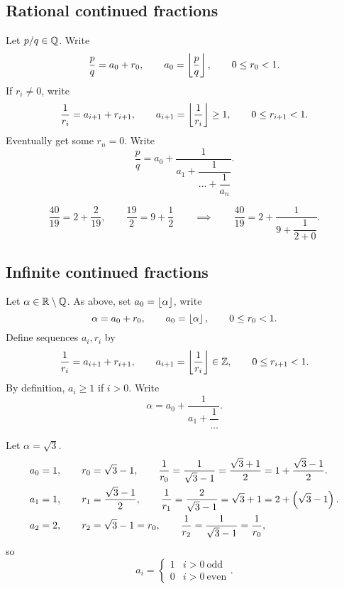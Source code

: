 \subsection{Rational continued fractions}

Let $ p / q \in \mathbb{Q} $. Write
$$ \dfrac{p}{q} = a_0 + r_0, \qquad a_0 = \left\lfloor \dfrac{p}{q} \right\rfloor, \qquad 0 \le r_0 < 1. $$
If $ r_i \ne 0 $, write
$$ \dfrac{1}{r_i} = a_{i + 1} + r_{i + 1}, \qquad a_{i + 1} = \left\lfloor \dfrac{1}{r_i} \right\rfloor \ge 1, \qquad 0 \le r_{i + 1} < 1. $$
Eventually get some $ r_n = 0 $. Write
$$ \dfrac{p}{q} = a_0 + \dfrac{1}{a_1 + \dfrac{1}{\dots + \dfrac{1}{a_n}}}. $$

\begin{example*}
$$ \dfrac{40}{19} = 2 + \dfrac{2}{19}, \qquad \dfrac{19}{2} = 9 + \dfrac{1}{2} \qquad \implies \qquad \dfrac{40}{19} = 2 + \dfrac{1}{9 + \dfrac{1}{2 + 0}}. $$
\end{example*}

\subsection{Infinite continued fractions}

Let $ \alpha \in \mathbb{R} \setminus \mathbb{Q} $. As above, set $ a_0 = \left\lfloor \alpha \right\rfloor $, write
$$ \alpha = a_0 + r_0, \qquad a_0 = \left\lfloor \alpha \right\rfloor, \qquad 0 \le r_0 < 1. $$
Define sequences $ a_i, r_i $ by
$$ \dfrac{1}{r_i} = a_{i + 1} + r_{i + 1}, \qquad a_{i + 1} = \left\lfloor \dfrac{1}{r_i} \right\rfloor \in \mathbb{Z}, \qquad 0 \le r_{i + 1} < 1. $$
By definition, $ a_i \ge 1 $ if $ i > 0 $. Write
$$ \alpha = a_0 + \dfrac{1}{a_1 + \dfrac{1}{\dots}}. $$

\begin{example*}
Let $ \alpha = \sqrt{3} $.
\begin{align*}
& a_0 = 1, \qquad r_0 = \sqrt{3} - 1, \qquad \dfrac{1}{r_0} = \dfrac{1}{\sqrt{3} - 1} = \dfrac{\sqrt{3} + 1}{2} = 1 + \dfrac{\sqrt{3} - 1}{2}. \\
& a_1 = 1, \qquad r_1 = \dfrac{\sqrt{3} - 1}{2}, \qquad \dfrac{1}{r_1} = \dfrac{2}{\sqrt{3} - 1} = \sqrt{3} + 1 = 2 + \br{\sqrt{3} - 1}. \\
& a_2 = 2, \qquad r_2 = \sqrt{3} - 1 = r_0, \qquad \dfrac{1}{r_2} = \dfrac{1}{\sqrt{3} - 1} = \dfrac{1}{r_0},
\end{align*}
so
$$ a_i =
\begin{cases}
1 & i > 0 \ \text{odd} \\
0 & i > 0 \ \text{even}
\end{cases}.
$$
\end{example*}

